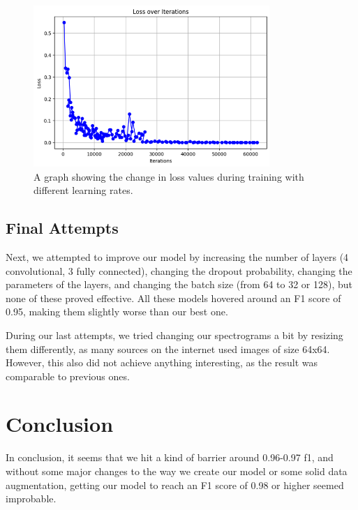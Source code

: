 \documentclass[11pt, letterpaper]{article}
\begin{document}
\begin{figure}[H]
    \centering
    \includegraphics[width=0.8\textwidth]{lossplot2.png}
    \caption{A graph showing the change in loss values during training with different learning rates.}
\end{figure}

\subsection{Final Attempts}

Next, we attempted to improve our model by increasing the number of layers (4 convolutional, 3 fully connected), changing the dropout probability, changing the parameters of the layers, and changing the batch size (from 64 to 32 or 128), but none of these proved effective. All these models hovered around an F1 score of 0.95, making them slightly worse than our best one.

During our last attempts, we tried changing our spectrograms a bit by resizing them differently, as many sources on the internet used images of size 64x64. However, this also did not achieve anything interesting, as the result was comparable to previous ones.

\section{Conclusion}

In conclusion, it seems that we hit a kind of barrier around 0.96-0.97 f1, and without some major changes to the way we create our model or some solid data augmentation, getting our model to reach an F1 score of 0.98 or higher seemed improbable.
\end{document}
